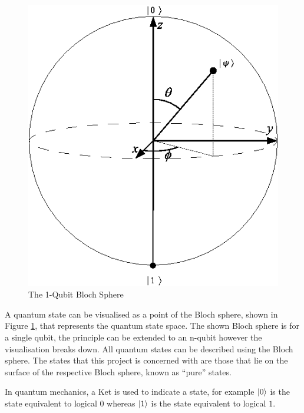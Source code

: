 \begin{figure}
\centering
\includegraphics[scale=0.5]{Bloch.png}
\caption{The 1-Qubit Bloch Sphere \cite{QuantikiBlochSphereImage}}
\label{BlochSphere}
\end{figure}

A quantum state can be visualised as a point of the Bloch sphere, shown in Figure \ref{BlochSphere}, that represents the quantum state space.
The shown Bloch sphere is for a single qubit, the principle can be extended to an n-qubit however the visualisation breaks down.
All quantum states can be described using the Bloch sphere.
The states that this project is concerned with are those that lie on the surface of the respective Bloch sphere, known as ``pure'' states.

In quantum mechanics, a Ket is used to indicate a state, for example $\left\vert{0}\right\rangle$ is the state equivalent to logical $0$ whereas $\left\vert{1}\right\rangle$ is the state equivalent to logical $1$.

